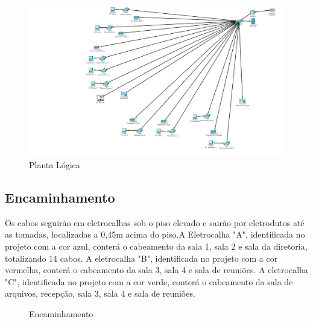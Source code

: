 \documentclass[	DIV=calc,%
paper=a4,%
fontsize=12pt,%
onecolumn]{scrartcl}	 					%
\begin{document}
		\begin{figure}[h]
			\centering
			
			\includegraphics[width=\textwidth]{fig2}
			\caption{Planta Lógica}
			\label{fig2}
		\end{figure}
	
	\subsection{Encaminhamento}
	Os cabos seguirão em eletrocalhas sob o piso elevado e sairão por eletrodutos até as tomadas, localizadas a 0,45m acima do piso.A Eletrocalha "A", identificada no projeto com a cor azul, conterá o cabeamento da sala 1, sala 2 e sala da diretoria, totalizando 14 cabos.
	A eletrocalha "B", identificada no projeto com a cor vermelha, conterá o cabeamento da sala 3, sala 4 e sala de reuniões.	A eletrocalha "C", identificada no projeto com a cor verde, conterá o cabeamento da sala de arquivos, recepção, sala 3, sala 4 e sala de reuniões. 
	
	
	\clearpage
	\recalctypearea
	
	\begin{figure}
		\noindent{}
		\caption{Encaminhamento}
		\label{fig3}
	\end{figure}
	
\end{document}
